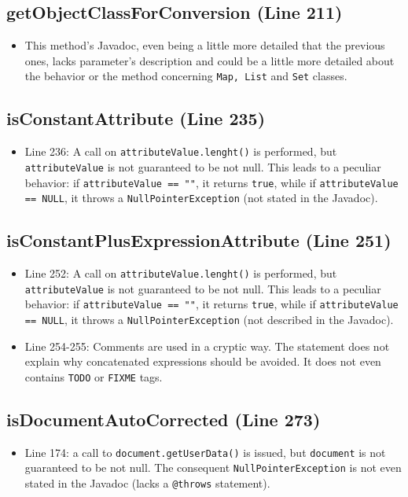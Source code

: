 \documentclass[11pt]{article} %
\begin{document}
\subsection{getObjectClassForConversion (Line 211)}
\begin{itemize}
	\item This method's Javadoc, even being a little more detailed that the previous ones, lacks parameter's description and could be a little more detailed about the behavior or the method concerning \texttt{Map, List} and \texttt{Set} classes.
\end{itemize}

\subsection{isConstantAttribute (Line 235)}
\begin{itemize}
	\item Line 236: A call on \texttt{attributeValue.lenght()} is performed, but \texttt{attributeValue} is not guaranteed to be not null. This leads to a peculiar behavior: if \texttt{attributeValue == ""}, it returns \texttt{true}, while if \texttt{attributeValue == NULL}, it throws a \texttt{NullPointerException} (not stated in the Javadoc).
\end{itemize}

\subsection{isConstantPlusExpressionAttribute (Line 251)}
\begin{itemize}
	\item Line 252: A call on \texttt{attributeValue.lenght()} is performed, but \texttt{attributeValue} is not guaranteed to be not null. This leads to a peculiar behavior: if \texttt{attributeValue == ""}, it returns \texttt{true}, while if \texttt{attributeValue == NULL}, it throws a \texttt{NullPointerException}
 (not described in the Javadoc).
	\item Line 254-255: Comments are used in a cryptic way. The statement does not explain why concatenated expressions should be avoided. It does not even contains \texttt{TODO} or \texttt{FIXME} tags.
\end{itemize}

\subsection{isDocumentAutoCorrected (Line 273)}
\begin{itemize}
	\item Line 174: a call to \texttt{document.getUserData()} is issued, but \texttt{document} is not guaranteed to be not null. The consequent  \texttt{NullPointerException} is not even stated in the Javadoc (lacks a  \texttt{@throws} statement).
\end{itemize}
\end{document}

